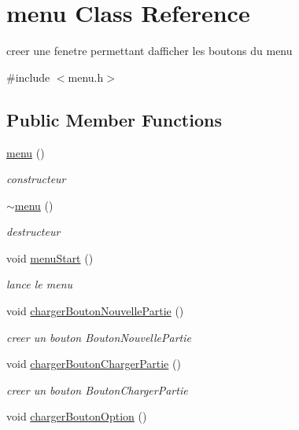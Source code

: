 \hypertarget{classmenu}{}\section{menu Class Reference}
\label{classmenu}


creer une fenetre permettant d\textquotesingle{}afficher les boutons du menu  




{\ttfamily \#include $<$menu.\+h$>$}

\subsection*{Public Member Functions}
\begin{DoxyCompactItemize}
\item 
\mbox{\hyperlink{classmenu_ad345b60b72c4992525cf064d5642c1d9}{menu}} ()
\begin{DoxyCompactList}\small\item\em constructeur \end{DoxyCompactList}\item 
\mbox{\hyperlink{classmenu_a5efbd22f23289b42ed68d2a9bb431f35}{$\sim$menu}} ()
\begin{DoxyCompactList}\small\item\em destructeur \end{DoxyCompactList}\item 
void \mbox{\hyperlink{classmenu_a0f6aa4e91d4c67fdb426e9d44d9ed177}{menu\+Start}} ()
\begin{DoxyCompactList}\small\item\em lance le menu \end{DoxyCompactList}\item 
void \mbox{\hyperlink{classmenu_ae677fc7873a22b0ed1de9f1f53e85d37}{charger\+Bouton\+Nouvelle\+Partie}} ()
\begin{DoxyCompactList}\small\item\em creer un bouton Bouton\+Nouvelle\+Partie \end{DoxyCompactList}\item 
void \mbox{\hyperlink{classmenu_ac5f982433431cf4a89d6b8abf6f9cc69}{charger\+Bouton\+Charger\+Partie}} ()
\begin{DoxyCompactList}\small\item\em creer un bouton Bouton\+Charger\+Partie \end{DoxyCompactList}\item 
void \mbox{\hyperlink{classmenu_a7b9fc371fe13a2bf37e876d7635299c9}{charger\+Bouton\+Option}} ()

\end{DoxyCompactItemize}
